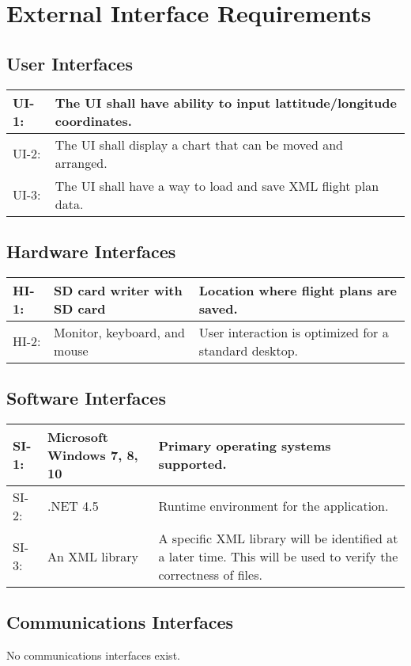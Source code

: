 \documentclass[12pt, letterpaper]{article}
\begin{document}
\pagebreak
\section{External Interface Requirements}
\subsection{User Interfaces}
\begin{tabularx}{\textwidth}{|l|X|} \hline
UI-1: & The UI shall have ability to input lattitude/longitude coordinates. \\ \hline
UI-2: & The UI shall display a chart that can be moved and arranged. \\ \hline
UI-3: & The UI shall have a way to load and save XML flight plan data. \\ \hline
\end{tabularx}

\subsection{Hardware Interfaces}
\begin{tabularx}{\textwidth}{|l|l|X|} \hline
HI-1: & SD card writer with SD card & Location where flight plans are saved. \\ \hline
HI-2: & Monitor, keyboard, and mouse & User interaction is optimized for a standard desktop. \\ \hline
\end{tabularx}

\subsection{Software Interfaces}
\begin{tabularx}{\textwidth}{|l|l|X|} \hline
SI-1: & Microsoft Windows 7, 8, 10 & Primary operating systems supported. \\ \hline
SI-2: & .NET 4.5 & Runtime environment for the application. \\ \hline
SI-3: & An XML library & A specific XML library will be identified at a later time.
    This will be used to verify the correctness of files. \\ \hline
\end{tabularx}

\subsection{Communications Interfaces}
No communications interfaces exist.
\end{document}
